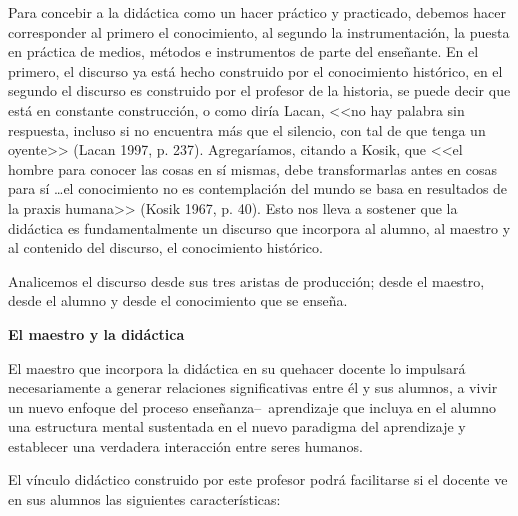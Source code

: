 Para concebir a la didáctica como un hacer práctico y practicado, 
debemos hacer corresponder al primero el conocimiento, al segundo la 
instrumentación, la puesta en práctica de medios, métodos e 
instrumentos de parte del enseñante. En el primero, el discurso ya está 
hecho construido por el conocimiento histórico, en el segundo el 
dis\-cur\-so es construido por el profesor de la historia, se puede decir 
que está en constante construcción, o como diría Lacan, <<no hay palabra 
sin respuesta, incluso si no encuentra más que el silencio, con tal de 
que tenga un oyente>> (Lacan 1997, p. 237). Agregaríamos, citando a Kosik, 
que <<el hombre para conocer las cosas en sí mismas, debe transformarlas 
antes en cosas para sí \ldots{}el conocimiento no es contemplación del mundo se 
basa en resultados de la praxis humana>> (Kosik 1967, p. 40). Esto nos 
lleva a sostener que la didáctica es fundamentalmente un discurso que 
incorpora al alumno, al maestro y al contenido del discurso, el 
conocimiento histórico.

Analicemos el discurso desde sus tres aristas de producción; desde el 
maestro, desde el alumno y desde el conocimiento que se enseña.

\medskip
\textbf{El maestro y la didáctica}

El maestro que incorpora la didáctica en su quehacer docente lo 
im\-pul\-sa\-rá necesariamente a generar relaciones significativas entre 
él y sus alumnos, a vivir un nuevo enfoque del proceso 
en\-se\-ñan\-za{--}~apren\-di\-za\-je que incluya en el alumno una 
estructura mental sustentada en el nuevo paradigma del aprendizaje y 
establecer una verdadera interacción entre seres humanos.

El vínculo didáctico construido por este profesor podrá facilitarse si 
el docente ve en sus alumnos las siguientes características:

